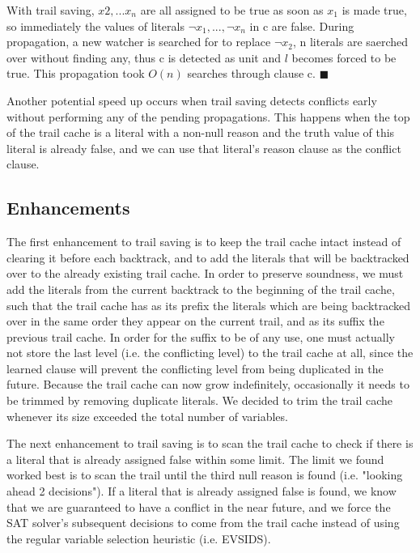 \documentclass{article}
\begin{document}
With trail saving, $x2, ... x_n$ are all assigned to be true as soon as $x_1$ is made true, so immediately the values of literals $\lnot x_1, ..., \lnot x_n$ in c are false. During propagation, a new watcher is searched for to replace $\lnot x_2$, n literals are saerched over without finding any, thus c is detected as unit and $l$ becomes forced to be true. This propagation took $O(n)$ searches through clause c. $\blacksquare$\newline

Another potential speed up occurs when trail saving detects conflicts early without performing any of the pending propagations. This happens when the top of the trail cache is a literal with a non-null reason and the truth value of this literal is already false, and we can use that literal's reason clause as the conflict clause.

\subsection{Enhancements}

The first enhancement to trail saving is to keep the trail cache intact instead of clearing it before each backtrack, and to add the literals that will be backtracked over to the already existing trail cache. In order to preserve soundness, we must add the literals from the current backtrack to the beginning of the trail cache, such that the trail cache has as its prefix the literals which are being backtracked over in the same order they appear on the current trail, and as its suffix the previous trail cache. In order for the suffix to be of any use, one must actually not store the last level (i.e. the conflicting level) to the trail cache at all, since the learned clause will prevent the conflicting level from being duplicated in the future. Because the trail cache can now grow indefinitely, occasionally it needs to be trimmed by removing duplicate literals. We decided to trim the trail cache whenever its size exceeded the total number of variables.

The next enhancement to trail saving is to scan the trail cache to check if there is a literal that is already assigned false within some limit. The limit we found worked best is to scan the trail until the third null reason is found (i.e. "looking ahead 2 decisions"). If a literal that is already assigned false is found, we know that we are guaranteed to have a conflict in the near future, and we force the SAT solver's subsequent decisions to come from the trail cache instead of using the regular variable selection heuristic (i.e. EVSIDS).
\end{document}
